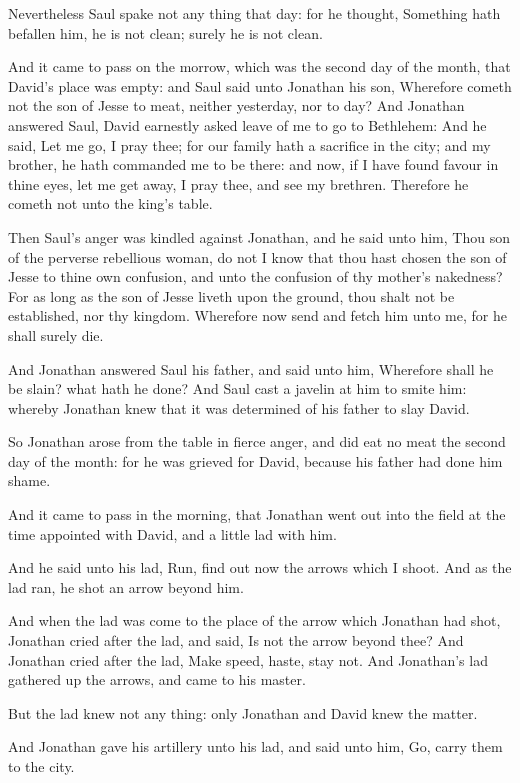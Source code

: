 \verse Nevertheless Saul spake not any thing that day: for he thought, Something hath befallen him, he is not clean; surely he is not clean.

\verse And it came to pass on the morrow, which was the second day of the month, that David's place was empty: and Saul said unto Jonathan his son, Wherefore cometh not the son of Jesse to meat, neither yesterday, nor to day?  \verse And Jonathan answered Saul, David earnestly asked leave of me to go to Bethlehem: \verse And he said, Let me go, I pray thee; for our family hath a sacrifice in the city; and my brother, he hath commanded me to be there: and now, if I have found favour in thine eyes, let me get away, I pray thee, and see my brethren. Therefore he cometh not unto the king's table.

\verse Then Saul's anger was kindled against Jonathan, and he said unto him, Thou son of the perverse rebellious woman, do not I know that thou hast chosen the son of Jesse to thine own confusion, and unto the confusion of thy mother's nakedness?  \verse For as long as the son of Jesse liveth upon the ground, thou shalt not be established, nor thy kingdom. Wherefore now send and fetch him unto me, for he shall surely die.

\verse And Jonathan answered Saul his father, and said unto him, Wherefore shall he be slain? what hath he done?  \verse And Saul cast a javelin at him to smite him: whereby Jonathan knew that it was determined of his father to slay David.

\verse So Jonathan arose from the table in fierce anger, and did eat no meat the second day of the month: for he was grieved for David, because his father had done him shame.

\verse And it came to pass in the morning, that Jonathan went out into the field at the time appointed with David, and a little lad with him.

\verse And he said unto his lad, Run, find out now the arrows which I shoot. And as the lad ran, he shot an arrow beyond him.

\verse And when the lad was come to the place of the arrow which Jonathan had shot, Jonathan cried after the lad, and said, Is not the arrow beyond thee?  \verse And Jonathan cried after the lad, Make speed, haste, stay not. And Jonathan's lad gathered up the arrows, and came to his master.

\verse But the lad knew not any thing: only Jonathan and David knew the matter.

\verse And Jonathan gave his artillery unto his lad, and said unto him, Go, carry them to the city.

